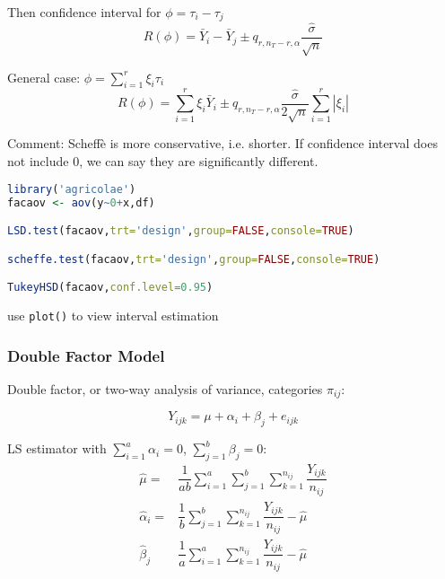 \begin{itemize}[topsep=2pt,itemsep=0pt]
    Then confidence interval for $ \phi =\tau_i-\tau_j $ 
    \begin{equation}
        R(\phi )=\bar{Y}_i-\bar{Y}_j\pm q_{r,n_T-r,\alpha }\dfrac{\hat{\sigma }}{\sqrt{n}}
    \end{equation}
    
    General case: $ \phi =\sum_{i=1}^r\xi _i\tau_i $
    \begin{equation}
        R(\phi )=\sum_{i=1}^r\xi _i\bar{Y}_i\pm q_{r,n_T-r,\alpha }\dfrac{\hat{\sigma }}{2\sqrt{n}}\sum_{i=1}^r|\xi _i|
    \end{equation}
    
     
\end{itemize}

    Comment: Scheff\`{e} is more conservative, i.e. shorter. If confidence interval does not include $ 0 $, we can say they are significantly different.

\begin{rcode}
\begin{lstlisting}[language=R]
library('agricolae')
facaov <- aov(y~0+x,df)

LSD.test(facaov,trt='design',group=FALSE,console=TRUE)

scheffe.test(facaov,trt='design',group=FALSE,console=TRUE)

TukeyHSD(facaov,conf.level=0.95)
\end{lstlisting}
use \lstinline|plot()| to view interval estimation
\end{rcode}    
    
    


\subsubsection{Double Factor Model}
    Double factor, or two-way analysis of variance, categories $ \pi_{ij} $:
    
    \begin{equation}
        Y_{ijk}= \mu +\alpha _i+\beta _j+e_{ijk}
    \end{equation}
    
    LS estimator with $ \sum_{i=1}^a \alpha _i=0 $, $ \sum_{j=1}^b\beta _j=0 $:
    \begin{align*}
        \hat{\mu }=&\dfrac{1}{ab}\sum_{i=1}^a\sum_{j=1}^b\sum_{k=1}^{n_{ij}}\dfrac{Y_{ijk}}{n_{ij}}\\
        \hat{\alpha }_i=&\dfrac{1}{b}\sum_{j=1}^b\sum_{k=1}^{n_{ij}}\dfrac{Y_{ijk}}{n_{ij}}-\hat{\mu }\\
        \hat{\beta }_j&\dfrac{1}{a}\sum_{i=1}^a\sum_{k=1}^{n_{ij}}\dfrac{Y_{ijk}}{n_{ij}}-\hat{\mu }
    \end{align*}
    
